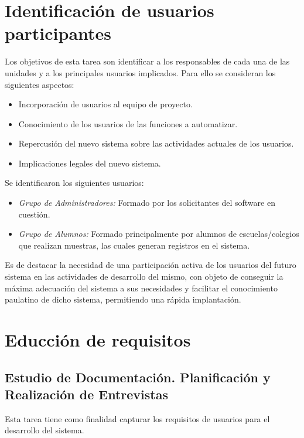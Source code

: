   \section{Identificación de usuarios participantes}

    Los objetivos de esta tarea son identificar a los responsables de cada una de las unidades y a los principales usuarios implicados. Para ello se consideran los siguientes aspectos:

    \begin{itemize}
      \item Incorporación de usuarios al equipo de proyecto.
      \item Conocimiento de los usuarios de las funciones a automatizar.
      \item Repercusión del nuevo sistema sobre las actividades actuales de los usuarios.
      \item Implicaciones legales del nuevo sistema.
    \end{itemize}

      Se identificaron los siguientes usuarios:

    \begin{itemize}
      \item \emph{Grupo de Administradores:} Formado por los solicitantes del software en cuestión.
      
      \item \emph{Grupo de Alumnos:} Formado principalmente por alumnos de escuelas/colegios que realizan muestras, las cuales generan registros en el sistema.
    \end{itemize}

    Es de destacar la necesidad de una participación activa de los usuarios del futuro sistema en las actividades de desarrollo del mismo, con objeto de conseguir la máxima adecuación del sistema a sus necesidades y facilitar el conocimiento paulatino de dicho sistema, permitiendo una rápida implantación.

  \section{Educción de requisitos}

    \subsection{Estudio de Documentación. Planificación y Realización de Entrevistas}

      Esta tarea tiene como finalidad capturar los requisitos de usuarios para el desarrollo del sistema.

